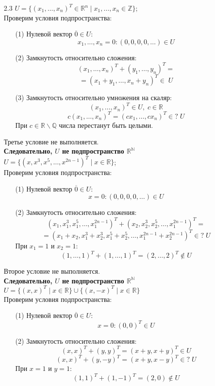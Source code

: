 \documentclass[a4paper]{article}
\newcommand{\RR}{\mathbb{R}}
\newcommand{\QQ}{\mathbb{Q}}
\newcommand{\ZZ}{\mathbb{Z}}
\newcommand{\NN}{\mathbb{N}}
\begin{document}
\begin{enumerate}
\begin{enumerate}
        \item[2.3]$U = \{(x_1, \ldots, x_n)^T  \in \RR^n \mid x_1, \ldots, x_n \in \ZZ\}$;\\
        Проверим условия подпространства:
        \begin{enumerate}
            \item[(1)]Нулевой вектор $\overline{0} \in U$:
            $$x_1, \ldots, x_n = 0: (0, 0, 0, 0, \dots) \in U$$
            \item[(2)]Замкнутость относительно сложения:
            $$(x_1, \ldots, x_n)^T + (y_1, \ldots, y_n)^T =$$
            $$= (x_1+y_1, \ldots, x_n+y_n)^T \in \; U$$
            \item[(3)]Замкнутость относительно умножения на скаляр:
            $$(x_1, \ldots, x_n)^T \in U, \; c \in \RR$$
            $$c(x_1, \ldots, x_n)^T = (cx_1, \ldots, cx_n)^T \in? \; U$$
            При $c \in \RR \backslash \QQ$ числа перестанут быть целыми.
        \end{enumerate}
        Третье условие не выполняется.\\
        \textbf{Следовательно, $U$ не подпространство $\RR^\NN$}\\

        $U = \{(x, x^3, x^5, \ldots, x^{2n-1})^T \mid x \in \RR\}$;\\
        Проверим условия подпространства:
        \begin{enumerate}
            \item[(1)]Нулевой вектор $\overline{0} \in U$:
            $$x = 0: (0, 0, 0, 0, \dots) \in U$$
            \item[(2)]Замкнутость относительно сложения:
            $$(x_1, x_1^3, x_1^5, \ldots, x_1^{2n-1})^T + (x_2, x_2^3, x_2^5, \ldots, x_1^{2n-1})^T =$$
            $$= (x_1+x_2, x_1^3+x_2^3, x_1^5+x_2^5, \ldots, x_1^{2n-1}+x_2^{2n-1})^T \in? \; U$$
            При $x_1 = 1$ и $x_2 = 1$:
            $$(1, \ldots, 1)^T+(1, \ldots, 1)^T = (2, \ldots, 2)^T \notin U$$
        \end{enumerate}
        Второе условие не выполняется.\\
        \textbf{Следовательно, $U$ не подпространство $\RR^\NN$}\\

        $U = \{(x, x)^T \mid x \in \RR\} \cup \{(x, -x)^T \mid x \in \RR\}$\\
        Проверим условия подпространства:
        \begin{enumerate}
            \item[(1)]Нулевой вектор $\overline{0} \in U$:
            $$x= 0: (0, 0)^T \in U$$
            \item[(2)]Замкнутость относительно сложения:
            $$(x, x)^T + (y, y)^T = (x+y, x+y)^T \in U$$
            $$(x, x)^T + (y, -y)^T = (x+y, x-y)^T \in? \; U$$
            При $x = 1$ и $y= 1$:
            $$(1, 1)^T + (1, -1)^T = (2, 0) \notin U$$
            

\end{enumerate}
\end{enumerate}
\end{enumerate}
\end{document}
